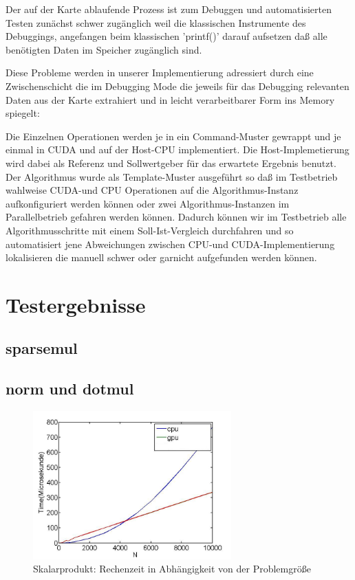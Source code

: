 \documentclass[journal]{IEEEtran}
\begin{document}
Der auf der Karte ablaufende Prozess ist zum Debuggen und
automatisierten Testen zunächst schwer zugänglich weil
die klassischen Instrumente des Debuggings, angefangen beim
klassischen 'printf()' darauf aufsetzen daß alle benötigten Daten
im Speicher zugänglich sind.

Diese Probleme werden in unserer Implementierung adressiert
durch eine Zwischenschicht die im Debugging Mode die jeweils
für das Debugging relevanten Daten aus der Karte extrahiert und
in leicht verarbeitbarer Form ins Memory spiegelt:

Die Einzelnen Operationen werden je in ein Command-Muster \cite{entwurfsmuster} gewrappt
und je einmal in CUDA und auf der Host-CPU implementiert. Die Host-Implemetierung
wird dabei als Referenz und Sollwertgeber für das erwartete Ergebnis benutzt.
Der Algorithmus wurde als Template-Muster ausgeführt so daß im Testbetrieb wahlweise
CUDA-und CPU Operationen auf die Algorithmus-Instanz aufkonfiguriert werden können
oder zwei Algorithmus-Instanzen im Parallelbetrieb gefahren werden können.
Dadurch können wir im Testbetrieb alle Algorithmusschritte mit einem Soll-Ist-Vergleich
durchfahren und so automatisiert jene Abweichungen zwischen CPU-und CUDA-Implementierung lokalisieren die
manuell schwer oder garnicht aufgefunden werden können.


\section{Testergebnisse}

\subsection{sparsemul}



\subsection{norm und dotmul}

\begin{figure}[htbp]

   \includegraphics[width=3in]{pix/dotmultime}

   \caption{ \label{dotmultime} Skalarprodukt: Rechenzeit in Abhängigkeit von der Problemgröße }%

\end{figure}
\end{document}
